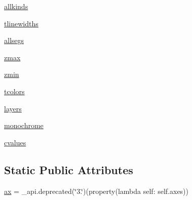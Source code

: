\begin{DoxyCompactItemize}
\item 
\hyperlink{classmatplotlib_1_1contour_1_1ContourSet_a3e665a273200ffef53426087c1066e8d}{allkinds}
\item 
\hyperlink{classmatplotlib_1_1contour_1_1ContourSet_a47685fdf86da69ecc37cbeed9d43942b}{tlinewidths}
\item 
\hyperlink{classmatplotlib_1_1contour_1_1ContourSet_a1b7f91e30d59ea37f24bed8a3596a324}{allsegs}
\item 
\hyperlink{classmatplotlib_1_1contour_1_1ContourSet_a3b97b091b63409d5cde8e9abf8f70c9a}{zmax}
\item 
\hyperlink{classmatplotlib_1_1contour_1_1ContourSet_abe4c68c53ab9ce214182576ef39b5ca8}{zmin}
\item 
\hyperlink{classmatplotlib_1_1contour_1_1ContourSet_ab79326a1f89a8e9c5c8c47b5613386f2}{tcolors}
\item 
\hyperlink{classmatplotlib_1_1contour_1_1ContourSet_acc409b9aea2e84266495ce192257e366}{layers}
\item 
\hyperlink{classmatplotlib_1_1contour_1_1ContourSet_ab18ae225479d26c988202b7222f45bb7}{monochrome}
\item 
\hyperlink{classmatplotlib_1_1contour_1_1ContourSet_acf44a1d5f507d7d4a3e667a5c3767d04}{cvalues}
\end{DoxyCompactItemize}
\subsection*{Static Public Attributes}
\begin{DoxyCompactItemize}
\item 
\hyperlink{classmatplotlib_1_1contour_1_1ContourSet_a3ae8b3ea504582cfb2b66cc79b932203}{ax} = \+\_\+api.\+deprecated(\char`\"{}3.\char`\"{})(property(lambda self\+: self.\+axes))
\end{DoxyCompactItemize}


